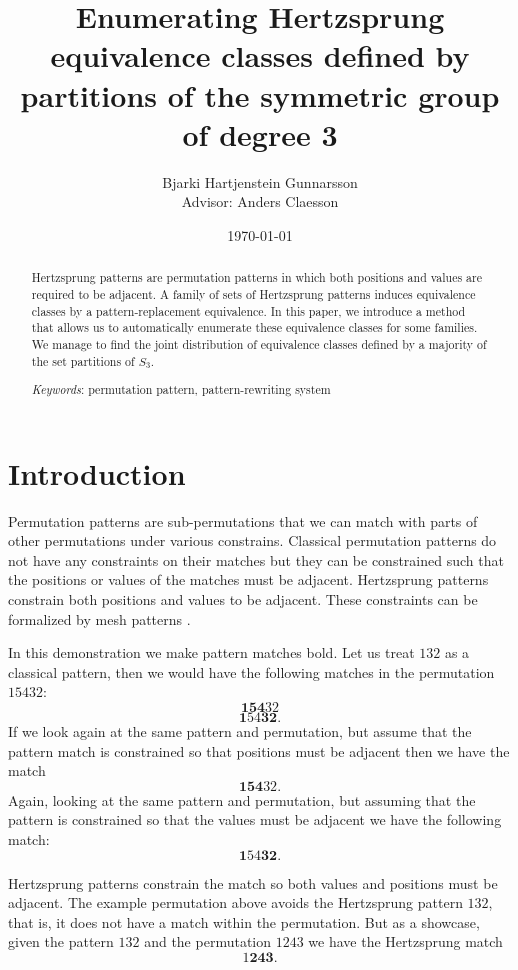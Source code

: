 \documentclass[a4paper, 11pt, english]{article}
\newcommand{\breath}{\vspace{6pt plus 2pt minus 1pt}\noindent}
\theoremstyle{definition}
\newcommand{\Sym}{S}
\begin{document}
\title{Enumerating Hertzsprung equivalence classes defined by partitions of the symmetric group of degree 3}
\author{Bjarki Hartjenstein Gunnarsson \\[0.6cm]{\small Advisor: Anders Claesson}}
\date{\today}
\maketitle

\begin{abstract}
    Hertzsprung patterns are permutation patterns in which both positions and values are required to
    be adjacent. A family of sets of Hertzsprung patterns induces equivalence classes by
    a pattern-replacement equivalence. In this paper, we introduce a method that allows us 
    to automatically enumerate these equivalence classes for some families. We manage to find the joint
    distribution of equivalence classes defined by a majority of the set partitions of $\Sym_3$.

    \breath \emph{Keywords}: permutation pattern, pattern-rewriting system
\end{abstract}

\section{Introduction}
Permutation patterns are sub-permutations that we can match with parts of other
permutations under various constrains. 
Classical permutation patterns do not have any constraints on their matches but they can
be constrained such that the positions or values of the matches must be adjacent.
Hertzsprung patterns constrain both positions and values to be adjacent. 
These constraints can be formalized by mesh patterns \cite{claesson:2011}.

In this demonstration we make pattern matches bold.  Let us treat $132$ as a classical
pattern, then we would have the following matches in the permutation $15432$:
\[
    \bm{154}32
\]
\[
    \bm{1}54\bm{32}.
\]
If we look again at the same pattern and permutation, but assume that the
pattern match is constrained so that positions must be adjacent then we have the match
\[
    \bm{154}32.
\]
Again, looking at the same pattern and permutation, but assuming that the
pattern is constrained so that the values must be adjacent we have the following
match:
\[
    \bm{1}54\bm{32}.
\]

Hertzsprung patterns constrain the match so both values and positions must be
adjacent. The example permutation above avoids the Hertzsprung pattern $132$, that is, it does not have a match
within the permutation. But as a showcase, given the pattern $132$ and the permutation $1243$ we
have the Hertzsprung match
\[
    1\bm{243}.
\]
\end{document}
